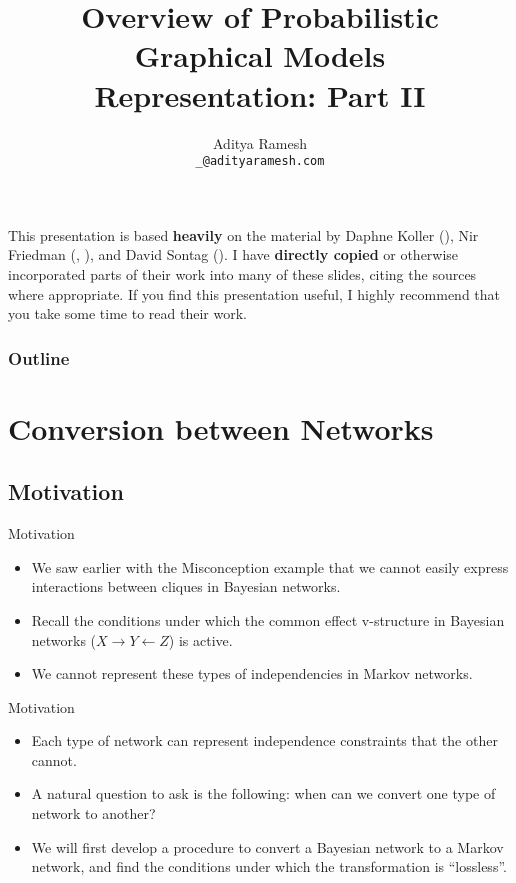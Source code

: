 \documentclass[11pt]{beamer}
\title[PGM Overview]{%
	Overview of Probabilistic Graphical Models\\
	Representation: Part II
}
\author[Aditya Ramesh]{%
	Aditya Ramesh \\
	\footnotesize\texttt{\_@adityaramesh.com}
}
\institute[University of Delaware]{%
	John Cavazos Lab\\
	University of Delaware\\
	Newark, Delaware 19716
}
\date{}
\begin{document}
\begin{frame}[plain]
\titlepage
\footnotesize
This presentation is based \textbf{heavily} on the material by Daphne Koller
(\cite{pgmbook}), Nir Friedman (\cite{pgmbook}, \cite{nirslides}), and David
Sontag (\cite{pgmslides}). I have \textbf{directly copied} or otherwise
incorporated parts of their work into many of these slides, citing the sources
where appropriate. If you find this presentation useful, I highly recommend that
you take some time to read their work.
\end{frame}

\begin{frame}
\frametitle{Outline}
\tableofcontents
\end{frame}

\section{Conversion between Networks \cite{pgmbook}}
\subsection{Motivation}

\begin{frame}{Motivation}
\begin{itemize}
	\item We saw earlier with the Misconception example that we cannot
	easily express interactions between cliques in Bayesian networks.
	\item Recall the conditions under which the common effect v-structure
	in Bayesian networks ($X \rightarrow Y \leftarrow Z$) is active.
	\item We cannot represent these types of independencies in Markov
	networks.
\end{itemize}
\end{frame}

\begin{frame}{Motivation}
\begin{itemize}
	\item Each type of network can represent independence constraints that
	the other cannot.
	\item A natural question to ask is the following: when can we convert
	one type of network to another?
	\item We will first develop a procedure to convert a Bayesian network to
	a Markov network, and find the conditions under which the transformation
	is ``lossless''.
\end{itemize}
\end{frame}
\end{document}
